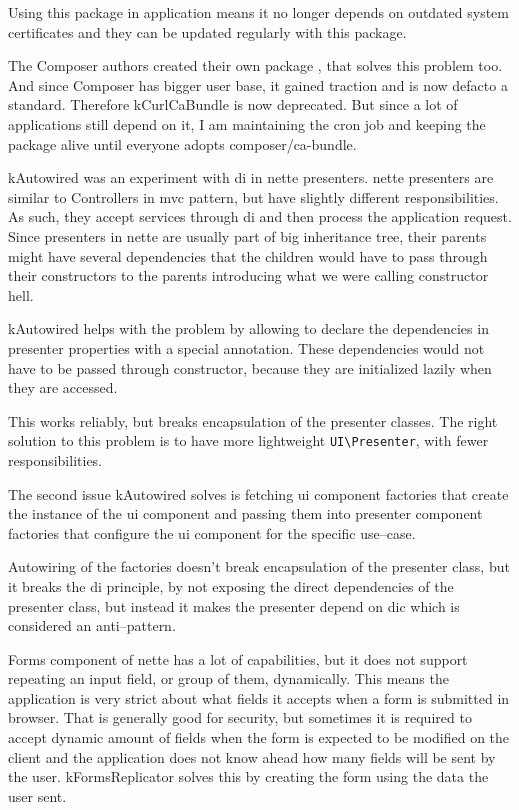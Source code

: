 Using this package in application means it no longer depends on outdated system certificates and they can be updated regularly with this package.

The Composer authors created their own package , that solves this problem too. And since Composer has bigger user base, it gained traction and is now defacto a standard. Therefore \gls{kCurlCaBundle} is now deprecated. But since a lot of applications still depend on it, I am maintaining the cron job and keeping the package alive until everyone adopts composer/ca-bundle.

 \label{sec:state:autowired}

\gls{kAutowired} was an experiment with \gls{di} in \gls{nette} presenters. \gls{nette} presenters are similar to Controllers in \gls{mvc} pattern, but have slightly different responsibilities. As such, they accept services through \gls{di} and then process the application request. Since presenters in \gls{nette} are usually part of big inheritance tree, their parents might have several dependencies that the children would have to pass through their constructors to the parents introducing what we were calling constructor hell.

\gls{kAutowired} helps with the problem by allowing to declare the dependencies in presenter properties with a special annotation. These dependencies would not have to be passed through constructor, because they are initialized lazily when they are accessed.

This works reliably, but breaks encapsulation of the presenter classes. The right solution to this problem is to have more lightweight \lstinline{UI\Presenter}, with fewer responsibilities.

The second issue \gls{kAutowired} solves is fetching \gls{ui} component factories that create the instance of the \gls{ui} component and passing them into presenter component factories that configure the \gls{ui} component for the specific use--case.

Autowiring of the factories doesn't break encapsulation of the presenter class, but it breaks the \gls{di} principle, by not exposing the direct dependencies of the presenter class, but instead it makes the presenter depend on \gls{dic} which is considered an anti--pattern.

 \label{sec:state:forms-replicator}

Forms component of \gls{nette} has a lot of capabilities, but it does not support repeating an input field, or group of them, dynamically. This means the application is very strict about what fields it accepts when a form is submitted in browser. That is generally good for security, but sometimes it is required to accept dynamic amount of fields when the form is expected to be modified on the client and the application does not know ahead how many fields will be sent by the user. \gls{kFormsReplicator} solves this by creating the form using the data the user sent.

